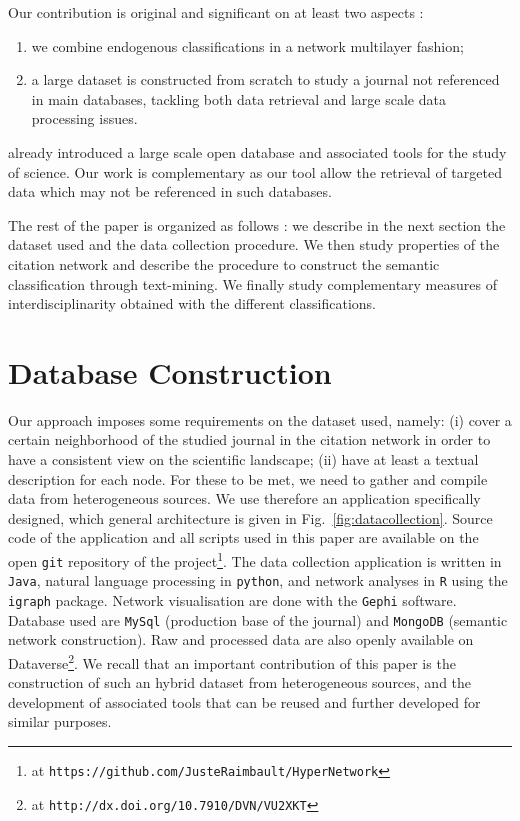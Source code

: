 Our contribution is original and significant on at least two aspects :
\begin{enumerate}
	\item we combine endogenous classifications in a network multilayer fashion;
	\item a large dataset is constructed from scratch to study a journal not referenced in main databases, tackling both data retrieval and large scale data processing issues.
\end{enumerate}

\cite{light2014open} already introduced a large scale open database and associated tools for the study of science. Our work is complementary as our tool allow the retrieval of targeted data which may not be referenced in such databases.

The rest of the paper is organized as follows : we describe in the next section the dataset used and the data collection procedure. We then study properties of the citation network and describe the procedure to construct the semantic classification through text-mining. We finally study complementary measures of interdisciplinarity obtained with the different classifications.




\section*{Database Construction}
\label{sec:data}



Our approach imposes some requirements on the dataset used, namely: (i) cover a certain neighborhood of the studied journal in the citation network in order to have a consistent view on the scientific landscape; (ii) have at least a textual description for each node. For these to be met, we need to gather and compile data from heterogeneous sources. We use therefore an application specifically designed, which general architecture is given in Fig.~\ref{fig:datacollection}. Source code of the application and all scripts used in this paper are available on the open \texttt{git} repository of the project\footnote{at \texttt{https://github.com/JusteRaimbault/HyperNetwork}}. The data collection application is written in \texttt{Java}, natural language processing in \texttt{python}, and network analyses in \texttt{R} using the \texttt{igraph} package. Network visualisation are done with the \texttt{Gephi} software. Database used are \texttt{MySql} (production base of the journal) and \texttt{MongoDB} (semantic network construction). Raw and processed data are also openly available on Dataverse\footnote{at \texttt{http://dx.doi.org/10.7910/DVN/VU2XKT}}. We recall that an important contribution of this paper is the construction of such an hybrid dataset from heterogeneous sources, and the development of associated tools that can be reused and further developed for similar purposes.



